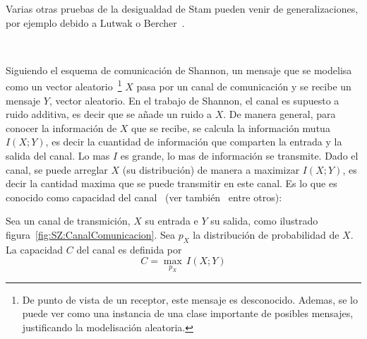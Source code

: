 Varias otras pruebas de la desigualdad de Stam pueden venir de generalizaciones,
por ejemplo debido  a Lutwak o Bercher~\cite{Lut, Ber}.  

\





\label{s:SZ:Ejemplos}



\label{sec:SZ:CanalCapacidad}

Siguiendo el  esquema de comunicaci\'on de  Shannon, un mensaje  que se modelisa
como  un vector  aleatorio~\footnote{De  punto  de vista  de  un receptor,  este
  mensaje es  desconocido. Ademas,  se lo  puede ver como  una instancia  de una
  clase  importante   de  posibles  mensajes,   justificando  la  modelisaci\'on
  aleatoria.} $X$  pasa por un  canal de comunicaci\'on  y se recibe  un mensaje
$Y$, vector  aleatorio. En el trabajo de  Shannon, el canal es  supuesto a ruido
additiva,  es decir que  se a\~nade  un ruido  a $X$.   De manera  general, para
conocer la informaci\'on de $X$ que se recibe, se calcula la informaci\'on mutua
$I(X;Y)$, es decir  la cuantidad de informaci\'on que comparten  la entrada y la
salida del canal.   Lo mas $I$ es grande, lo mas  de informaci\'on se transmite.
Dado el canal,  se puede arreglar $X$ (su distribuci\'on)  de manera a maximizar
$I(X;Y)$, es decir la cantidad maxima  que se puede transmitir en este canal. Es
lo que  es conocido como capacidad  del canal~\cite[part.~II~\&~III]{Sha48} (ver
tambi\'en~\cite{CovTho06, Rio07} entre otros):
%
\begin{definicion}
  Sea un canal de transmici\'on, $X$  su entrada e $Y$ su salida, como ilustrado
  figura~\ref{fig:SZ:CanalComunicacion}.   Sea   $p_X$   la  distribuci\'on   de
  probabilidad  de  $X$. La  capacidad  $C$  del canal  es  definida  por
  \[
  C = \max_{p_X} \, I(X;Y)
  \]
\end{definicion}

